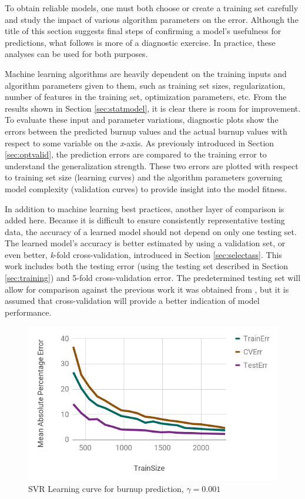 To obtain reliable models, one must both choose or create a training set
carefully and study the impact of various algorithm parameters on the error.
Although the title of this section suggests final steps of confirming a model's
usefulness for predictions, what follows is more of a diagnostic exercise. 
In practice, these analyses can be used for both purposes.

Machine learning algorithms are heavily dependent on the training inputs and
algorithm parameters given to them, such as training set sizes, regularization,
number of features in the training set, optimization parameters, etc.  From the
results shown in Section \ref{sec:statmodel}, it is clear there is room for
improvement.  To evaluate these input and parameter variations, diagnostic
plots show the errors between the predicted burnup values and the actual burnup
values with respect to some variable on the \textit{x}-axis.  As previously
introduced in Section \ref{sec:optvalid}, the prediction errors are compared to
the training error to understand the generalization strength. These two errors
are plotted with respect to training set size (learning curves) and the
algorithm parameters governing model complexity (validation curves) to provide
insight into the model fitness. 

In addition to machine learning best practices, another layer of comparison is
added here.  Because it is difficult to ensure consistently representative
testing data, the accuracy of a learned model should not depend on only one
testing set.  The learned model's accuracy is better estimated by using a
validation set, or even better, \textit{k}-fold cross-validation, introduced in
Section \ref{sec:selectass}. This work includes both the testing error (using
the testing set described in Section \ref{sec:training}) and 5-fold
cross-validation error. The predetermined testing set will allow for comparison
against the previous work it was obtained from \cite{dayman_feasibility_2013},
but it is assumed that cross-validation will provide a better indication of
model performance.

\begin{figure}[!htb]
    \centering
    \includegraphics[width=\linewidth]{./chapters/demo_method/lc1.png}
    \caption{\gls{SVR} Learning curve for burnup prediction, $\gamma = 0.001$}
    \label{fig:lc1}
\end{figure}


